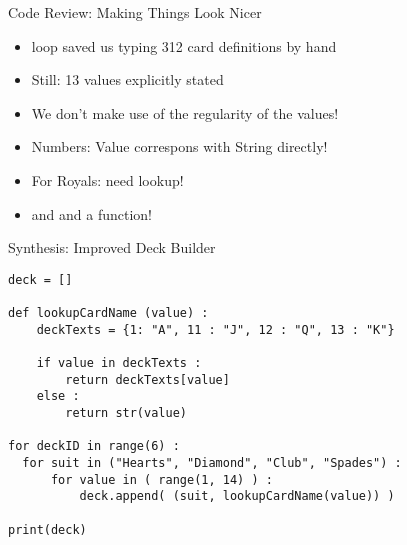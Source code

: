 
\begin{frame}[fragile]{Code Review: Making Things Look Nicer}
%
\begin{itemize}
\item {} loop saved us typing 312 card definitions by hand
\item Still: 13 values explicitly stated
\item We don't make use of the regularity of the values!
\item Numbers: Value correspons with String directly!
\item For Royals: need lookup!
\item[\Thus]  and  and a function!
\end{itemize}
%
\end{frame}


\begin{frame}[fragile]{Synthesis: Improved Deck Builder}
%
\begin{codebox}
\begin{verbatim}
deck = []

def lookupCardName (value) :
    deckTexts = {1: "A", 11 : "J", 12 : "Q", 13 : "K"}
    
    if value in deckTexts :
        return deckTexts[value]
    else :
        return str(value)

for deckID in range(6) :
  for suit in ("Hearts", "Diamond", "Club", "Spades") :
      for value in ( range(1, 14) ) :
          deck.append( (suit, lookupCardName(value)) )

print(deck)
\end{verbatim}
\end{codebox}
%
\end{frame}


